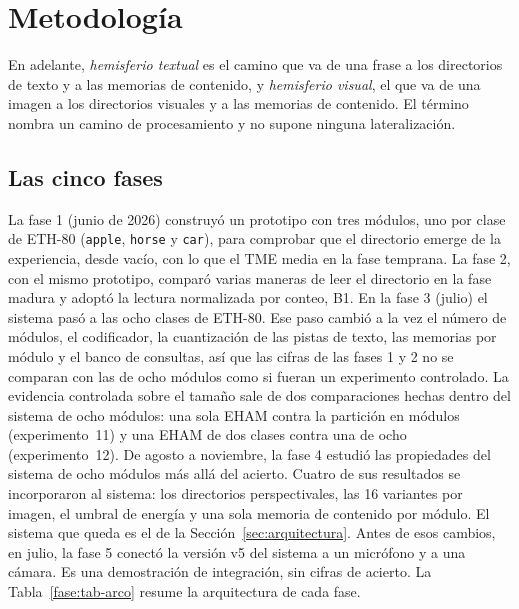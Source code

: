 \section{Metodología}
\label{sec:metodologia}

En adelante, \emph{hemisferio textual} es el camino que va de una frase a los
directorios de texto y a las memorias de contenido, y \emph{hemisferio visual}, el que
va de una imagen a los directorios visuales y a las memorias de contenido.
El término nombra un camino de procesamiento y no supone ninguna lateralización.

\subsection{Las cinco fases}
\label{fase:arco}

La fase 1 (junio de 2026) construyó un prototipo con tres módulos, uno por clase de
ETH-80 (\texttt{apple}, \texttt{horse} y \texttt{car}), para comprobar que el
directorio emerge de la experiencia, desde vacío, con lo que el TME media en la fase
temprana.
La fase 2, con el mismo prototipo, comparó varias maneras de leer el directorio en la
fase madura y adoptó la lectura normalizada por conteo, B1.
En la fase 3 (julio) el sistema pasó a las ocho clases de ETH-80.
Ese paso cambió a la vez el número de módulos, el codificador, la cuantización de las
pistas de texto, las memorias por módulo y el banco de consultas, así que las cifras de
las fases 1 y 2 no se comparan con las de ocho módulos como si fueran un experimento
controlado.
La evidencia controlada sobre el tamaño sale de dos comparaciones hechas dentro del
sistema de ocho módulos: una sola EHAM contra la partición en módulos (experimento~11)
y una EHAM de dos clases contra una de ocho (experimento~12).
De agosto a noviembre, la fase 4 estudió las propiedades del sistema de ocho módulos
más allá del acierto.
Cuatro de sus resultados se incorporaron al sistema: los directorios perspectivales,
las 16 variantes por imagen, el umbral de energía y una sola memoria de contenido por
módulo.
El sistema que queda es el de la Sección~\ref{sec:arquitectura}.
Antes de esos cambios, en julio, la fase 5 conectó la versión v5 del sistema a un
micrófono y a una cámara.
Es una demostración de integración, sin cifras de acierto.
La Tabla~\ref{fase:tab-arco} resume la arquitectura de cada fase.

